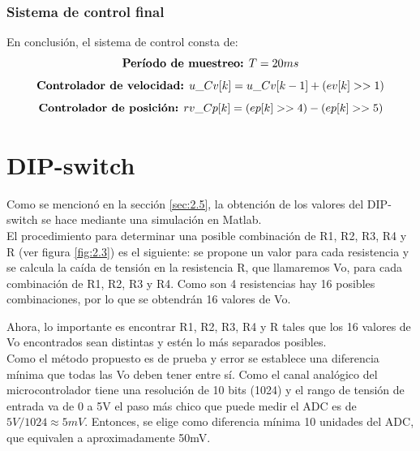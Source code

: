 \subsubsection{Sistema de control final}

En conclusión, el sistema de control consta de:
 \[ \text{\textbf{Período de muestreo:} }  T = 20ms \]
\begin{equation} \label{eq:\theequation}
\text{\textbf{Controlador de velocidad:} } u\_Cv[k] = u\_Cv[k-1] + (ev[k] >> 1)
\end{equation}
\begin{equation} \label{eq:\theequation}
\text{\textbf{Controlador de posición:} } rv\_Cp[k] = (ep[k] >> 4) - (ep[k] >> 5)
\end{equation}

\newpage
\section{DIP-switch} \label{sec:\thesection}
Como se mencionó en la sección \ref{sec:2.5}, la obtención de los valores del DIP-switch se hace mediante una simulación en Matlab.\\
El procedimiento para determinar una posible combinación de R1, R2, R3, R4 y R (ver figura \ref{fig:2.3}) es el siguiente: se propone un valor para cada resistencia y se calcula la caída de tensión en la resistencia R, que llamaremos Vo, para cada combinación de R1, R2, R3 y R4. Como son 4 resistencias hay 16 posibles combinaciones, por lo que se obtendrán 16 valores de Vo. 

Ahora, lo importante es encontrar R1, R2, R3, R4 y R tales que los 16 valores de Vo encontrados sean distintas y estén lo más separados posibles.\\
Como el método propuesto es de prueba y error se establece una diferencia mínima que todas las Vo deben tener entre sí. Como el canal analógico del microcontrolador tiene una resolución de 10 bits (1024) y el rango de tensión de entrada va de 0 a 5V el paso más chico que puede medir el ADC es de \(5V/1024 \approx 5mV\). Entonces, se elige como diferencia mínima 10 unidades del ADC, que equivalen a aproximadamente 50mV.

